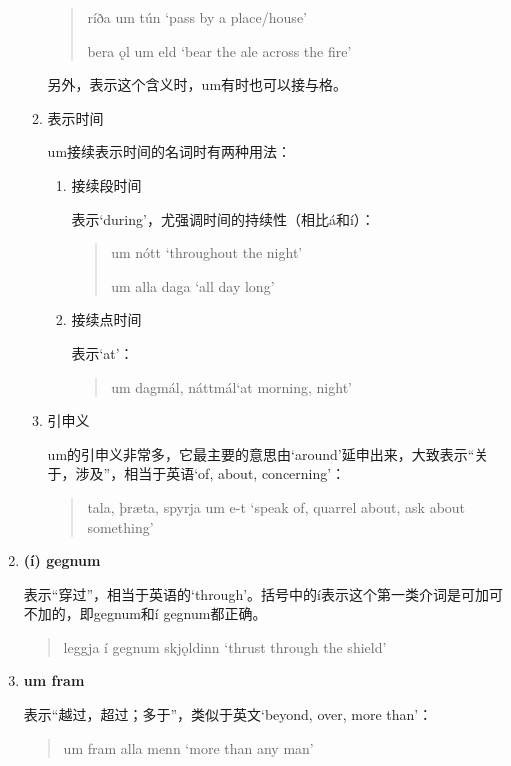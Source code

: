 \begin{enumerate}[itemindent=1em, label=\textbf{\arabic*}.]
\begin{enumerate}
\begin{quote}
                        ríða um tún `pass by a place/house'

                        bera \k{o}l um eld `bear the ale across the fire'
                    \end{quote}
                    另外，表示这个含义时，um有时也可以接与格。
              \item 表示时间

                    um接续表示时间的名词时有两种用法：
                    \begin{enumerate}
                        \item 接续段时间

                              表示`during'，尤强调时间的持续性（相比á和í）：
                              \begin{quote}
                                  um nótt `throughout the night'

                                  um alla daga `all day long'
                              \end{quote}

                        \item 接续点时间

                              表示`at'：
                              \begin{quote}
                                  um dagmál, náttmál\footnotemark `at morning, night'
                              \end{quote}
                    \end{enumerate}

              \item 引申义

                    um的引申义非常多，它最主要的意思由`around'延申出来，大致表示“关于，涉及”，相当于英语`of, about, concerning'：
                    \begin{quote}
                        tala, þræta, spyrja um e-t `speak of, quarrel about, ask about something'
                    \end{quote}
          \end{enumerate}
    \item \textbf{(í) gegnum}

          表示“穿过”，相当于英语的`through'。括号中的í表示这个第一类介词是可加可不加的，即gegnum和í gegnum都正确。
          \begin{quote}
              leggja í gegnum skj\k{o}ldinn `thrust through the shield'
          \end{quote}

    \item \textbf{um fram}

          表示“越过，超过；多于”，类似于英文`beyond, over, more than'：
          \begin{quote}
              um fram alla menn `more than any man'
          \end{quote}

\end{enumerate}
